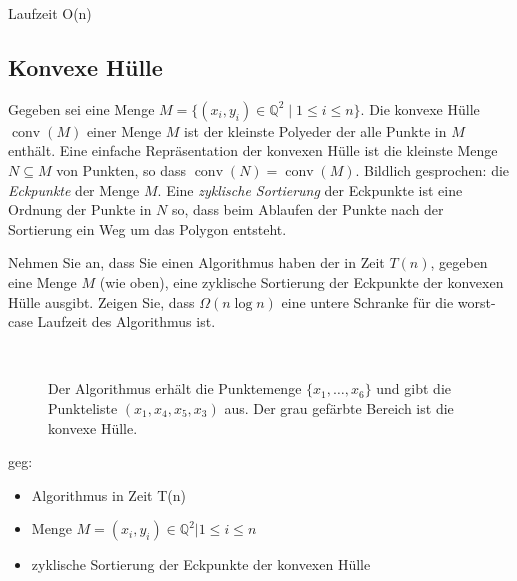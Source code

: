 \documentclass[paper=a4, fontsize=11pt]{scrartcl}
\numberwithin{equation}{section}
\numberwithin{figure}{section}
\numberwithin{table}{section}
\begin{document}
Laufzeit O(n)

\subsection{Konvexe Hülle}
Gegeben sei eine Menge $M=\{(x_i, y_i)\in \mathbb Q^2 \mid 1 \leq i \leq n\}$. Die konvexe Hülle $\operatorname{conv}(M)$ einer Menge $M$ ist der kleinste Polyeder der alle Punkte in $M$ enthält. Eine einfache Repräsentation der konvexen Hülle ist die kleinste Menge $N \subseteq M$ von Punkten, so dass $\operatorname{conv}(N)=\operatorname{conv}(M)$. Bildlich gesprochen: die \textit{Eckpunkte} der Menge $M$. Eine \textit{zyklische Sortierung} der Eckpunkte ist eine Ordnung der Punkte in $N$ so, dass beim Ablaufen der Punkte nach der Sortierung ein Weg um das Polygon entsteht.

\medskip\noindent Nehmen Sie an, dass Sie einen Algorithmus haben der in Zeit $T(n)$, gegeben eine Menge $M$ (wie oben), eine zyklische Sortierung der Eckpunkte der konvexen Hülle ausgibt. Zeigen Sie, dass $\Omega(n \log n)$ eine untere Schranke für die worst-case Laufzeit des Algorithmus ist.

\begin{figure}[htp!]
\begin{center}
  \\
\end{center}
\caption{Der Algorithmus erhält die Punktemenge $\{x_1,\dots,x_6\}$ und gibt die Punkteliste $(x_1,x_4,x_5,x_3)$ aus. Der grau gefärbte Bereich ist die konvexe Hülle.
}\end{figure}

geg: 
\begin{itemize}
\item Algorithmus in Zeit T(n)
\item Menge $M= {(x_{i},y_{i}) \in \mathbb{Q}^{2} | 1 \leq i \leq n}$
\item zyklische Sortierung der Eckpunkte der konvexen Hülle
\end{itemize} \\
\end{document}
